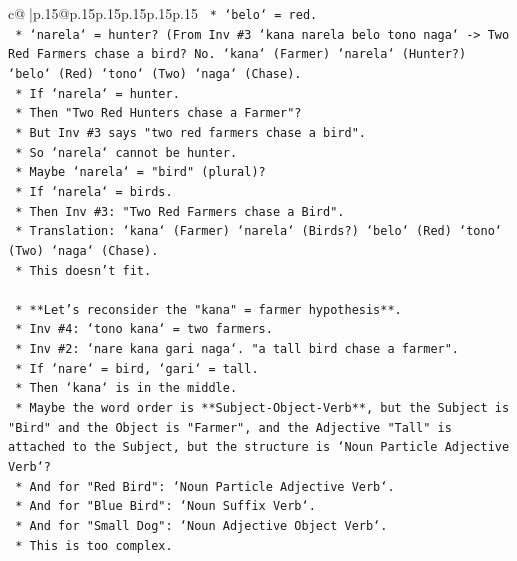 \documentclass{article}
\begin{document}
{\begin{supertabular}{c@{$\;$}|p{.15\linewidth}@{}p{.15\linewidth}p{.15\linewidth}p{.15\linewidth}p{.15\linewidth}p{.15\linewidth}}
{{{\texttt{            *   `belo` = red.} \\
\texttt{            *   `narela` = hunter? (From Inv \#3 `kana narela belo tono naga` {-}> Two Red Farmers chase a bird? No. `kana` (Farmer) `narela` (Hunter?) `belo` (Red) `tono` (Two) `naga` (Chase).} \\
\texttt{            *   If `narela` = hunter.} \\
\texttt{            *   Then "Two Red Hunters chase a Farmer"?} \\
\texttt{            *   But Inv \#3 says "two red farmers chase a bird".} \\
\texttt{            *   So `narela` cannot be hunter.} \\
\texttt{            *   Maybe `narela` = "bird" (plural)?} \\
\texttt{            *   If `narela` = birds.} \\
\texttt{            *   Then Inv \#3: "Two Red Farmers chase a Bird".} \\
\texttt{            *   Translation: `kana` (Farmer) `narela` (Birds?) `belo` (Red) `tono` (Two) `naga` (Chase).} \\
\texttt{            *   This doesn't fit.} \\
\\ 
\texttt{    *   **Let's reconsider the "kana" = farmer hypothesis**.} \\
\texttt{        *   Inv \#4: `tono kana` = two farmers.} \\
\texttt{        *   Inv \#2: `nare kana gari naga`. "a tall bird chase a farmer".} \\
\texttt{        *   If `nare` = bird, `gari` = tall.} \\
\texttt{        *   Then `kana` is in the middle.} \\
\texttt{        *   Maybe the word order is **Subject{-}Object{-}Verb**, but the Subject is "Bird" and the Object is "Farmer", and the Adjective "Tall" is attached to the Subject, but the structure is `Noun Particle Adjective Verb`?} \\
\texttt{        *   And for "Red Bird": `Noun Particle Adjective Verb`.} \\
\texttt{        *   And for "Blue Bird": `Noun Suffix Verb`.} \\
\texttt{        *   And for "Small Dog": `Noun Adjective Object Verb`.} \\
\texttt{        *   This is too complex.} \\
\\ 
}}}
\end{supertabular}}
\end{document}
